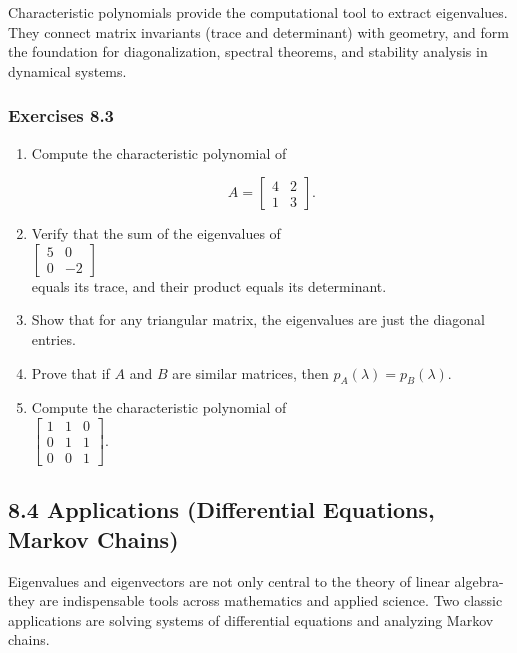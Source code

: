 \documentclass[
  12pt,
  a4paper,
]{article}
\begin{document}
Characteristic polynomials provide the computational tool to extract
eigenvalues. They connect matrix invariants (trace and determinant) with
geometry, and form the foundation for diagonalization, spectral
theorems, and stability analysis in dynamical systems.

\subsubsection{Exercises 8.3}\label{exercises-83}

\begin{enumerate}
\def\labelenumi{\arabic{enumi}.}
\item
  Compute the characteristic polynomial of

  \[A = \begin{bmatrix} 4 & 2 \\ 1 & 3 \end{bmatrix}.\]
\item
  Verify that the sum of the eigenvalues of\\
  \(\begin{bmatrix} 5 & 0 \\ 0 & -2 \end{bmatrix}\)\\
  equals its trace, and their product equals its determinant.
\item
  Show that for any triangular matrix, the eigenvalues are just the
  diagonal entries.
\item
  Prove that if \(A\) and \(B\) are similar matrices, then
  \(p_A(\lambda) = p_B(\lambda)\).
\item
  Compute the characteristic polynomial of\\
  \(\begin{bmatrix} 1 & 1 & 0 \\ 0 & 1 & 1 \\ 0 & 0 & 1 \end{bmatrix}\).
\end{enumerate}

\subsection{8.4 Applications (Differential Equations, Markov
Chains)}\label{84-applications-differential-equations-markov-chains}

Eigenvalues and eigenvectors are not only central to the theory of
linear algebra-they are indispensable tools across mathematics and
applied science. Two classic applications are solving systems of
differential equations and analyzing Markov chains.
\end{document}
